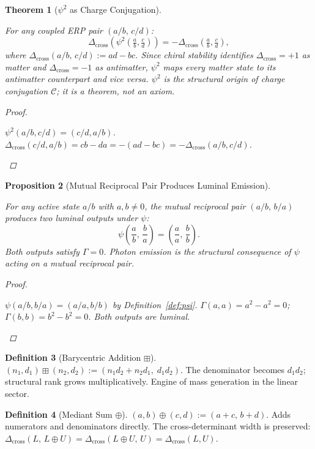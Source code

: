 \documentclass[11pt,letterpaper]{article}
\theoremstyle{plain}
\newtheorem{theorem}{Theorem}[section]
\newtheorem{proposition}[theorem]{Proposition}
\theoremstyle{definition}
\newtheorem{definition}[theorem]{Definition}
\theoremstyle{remark}
\newcommand{\bplus}{\boxplus}
\newcommand{\med}{\oplus}
\newcommand{\Dcross}{\Delta_{\mathrm{cross}}}
\newcommand{\Tcharge}{\Gamma}
\begin{document}
\begin{theorem}[$\psi^2$ as Charge Conjugation]\label{thm:cc}
\begin{rsbox}
For any coupled ERP pair $(a/b,\,c/d)$:
\[
\Dcross\!\left(\psi^2\!\left(\tfrac{a}{b},\tfrac{c}{d}\right)\right)
  =-\Dcross\!\left(\tfrac{a}{b},\tfrac{c}{d}\right),
\]
where $\Dcross(a/b,\,c/d):=ad-bc$.  Since chiral stability
identifies $\Dcross=+1$ as matter and $\Dcross=-1$ as antimatter,
$\psi^2$ maps every matter state to its antimatter counterpart and
vice versa.  $\psi^2$ is the structural origin of charge
conjugation $\mathcal{C}$; it is a theorem, not an axiom.
\end{rsbox}
\begin{proof}
\begin{rsbox}
$\psi^2(a/b,c/d)=(c/d,a/b)$.
$\Dcross(c/d,a/b)=cb-da=-(ad-bc)=-\Dcross(a/b,c/d)$.
\end{rsbox}
\end{proof}
\end{theorem}

\begin{proposition}[Mutual Reciprocal Pair Produces Luminal
Emission]\label{prop:photon}
\begin{rsbox}
For any active state $a/b$ with $a,b\neq0$, the mutual reciprocal
pair $(a/b,\,b/a)$ produces two luminal outputs under $\psi$:
\[
\psi\!\left(\frac{a}{b},\,\frac{b}{a}\right)
  =\left(\frac{a}{a},\,\frac{b}{b}\right).
\]
Both outputs satisfy $\Tcharge=0$.  Photon emission is the structural
consequence of $\psi$ acting on a mutual reciprocal pair.
\end{rsbox}
\begin{proof}
\begin{rsbox}
$\psi(a/b,b/a)=(a/a,b/b)$ by Definition~\ref{def:psi}.
$\Tcharge(a,a)=a^2-a^2=0$; $\Tcharge(b,b)=b^2-b^2=0$.
Both outputs are luminal.
\end{rsbox}
\end{proof}
\end{proposition}

\begin{definition}[Barycentric Addition
$\bplus$]\label{def:bplus}
$(n_1,d_1)\bplus(n_2,d_2):=(n_1 d_2+n_2 d_1,\;d_1 d_2)$.
The denominator becomes $d_1 d_2$; structural rank grows
multiplicatively.  Engine of mass generation in the linear sector.
\end{definition}

\begin{definition}[Mediant Sum $\med$]\label{def:med}
$(a,b)\med(c,d):=(a+c,\,b+d)$.  Adds numerators and denominators
directly.  The cross-determinant width is preserved:
$\Dcross(L,\,L\med U)=\Dcross(L\med U,\,U)=\Dcross(L,U)$.
\end{definition}
\end{document}
